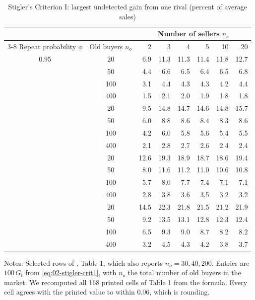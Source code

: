 \begin{table}[htbp]
\centering
\begin{threeparttable}
\caption{Stigler's Criterion I: largest undetected gain from one rival (percent of average sales)}
\label{tab:02-stigler-t1}
\small
\begin{tabular}{@{}cc*{6}{r}@{}}
\toprule
& & \multicolumn{6}{c}{Number of sellers $n_s$} \\
\cmidrule(l){3-8}
Repeat probability $\phi$ & Old buyers $n_o$ & 2 & 3 & 4 & 5 & 10 & 20 \\
\midrule
0.95 & 20  & 6.9 & 11.3 & 11.3 & 11.4 & 11.8 & 12.7 \\
     & 50  & 4.4 & 6.6  & 6.5  & 6.4  & 6.5  & 6.8  \\
     & 100 & 3.1 & 4.4  & 4.3  & 4.3  & 4.2  & 4.4  \\
     & 400 & 1.5 & 2.1  & 2.0  & 1.9  & 1.8  & 1.8  \\
\addlinespace
0.90 & 20  & 9.5 & 14.8 & 14.7 & 14.6 & 14.8 & 15.7 \\
     & 50  & 6.0 & 8.8  & 8.6  & 8.4  & 8.3  & 8.6  \\
     & 100 & 4.2 & 6.0  & 5.8  & 5.6  & 5.4  & 5.5  \\
     & 400 & 2.1 & 2.8  & 2.7  & 2.6  & 2.4  & 2.4  \\
\addlinespace
0.80 & 20  & 12.6 & 19.3 & 18.9 & 18.7 & 18.6 & 19.4 \\
     & 50  & 8.0  & 11.6 & 11.2 & 11.0 & 10.6 & 10.8 \\
     & 100 & 5.7  & 8.0  & 7.7  & 7.4  & 7.1  & 7.1  \\
     & 400 & 2.8  & 3.8  & 3.6  & 3.5  & 3.2  & 3.2  \\
\addlinespace
0.70 & 20  & 14.5 & 22.3 & 21.8 & 21.5 & 21.2 & 21.9 \\
     & 50  & 9.2  & 13.5 & 13.1 & 12.8 & 12.3 & 12.4 \\
     & 100 & 6.5  & 9.3  & 9.0  & 8.7  & 8.2  & 8.2  \\
     & 400 & 3.2  & 4.5  & 4.3  & 4.2  & 3.8  & 3.7  \\
\bottomrule
\end{tabular}
\begin{tablenotes}\footnotesize
\item Notes: Selected rows of \citet{Stigler1964}, Table 1, which also reports $n_o = 30, 40, 200$. Entries are
$100\,G_{\mathrm{I}}$ from \eqref{eq:02-stigler-crit1}, with $n_o$ the total number of old buyers in the market.
We recomputed all 168 printed cells of Table 1 from the formula. Every cell agrees with the printed value to within
0.06, which is rounding.
\end{tablenotes}
\end{threeparttable}
\end{table}

